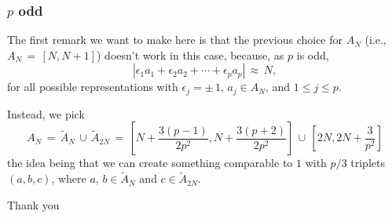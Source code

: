\documentclass{beamer}
\numberwithin{equation}{section}
\begin{document}
\begin{frame}
  \frametitle{$p$ odd}
The first remark we want to make here is that the previous choice for $A_N$ (i.e., $A_N\,=\,[N,N+1]$) doesn't work in this case, because, as $p$ is odd, 
\[
\left|\epsilon_1 a_1+\epsilon_2 a_2+ \cdots+\epsilon_p a_p\right|\,\approx\,N, 
\]
for all possible representations with $\epsilon_j=\pm \,1$, $a_j\in A_N$,  and $1\leq j\leq p$. 

\pause
Instead, we pick
\[
A_N\,=\,\tilde{A}_N\,\cup\,\tilde{A}_{2N}\,=\,\left[N+\frac{3(p-1)}{2p^2},N+\frac{3(p+2)}{2p^2}\right]\,\cup\, \left[2N, 2N+\frac{3}{p^2}\right]
\]
\pause
the idea being that we can create something comparable to $1$ with $p/3$ triplets $(a,b,c)$, where $a$, $b \in \tilde{A}_N$ and $c \in \tilde{A}_{2N}$.
\end{frame}
\begin{frame}
  \begin{center}
    \Large{Thank you}
\end{center}
\end{frame}
\end{document}
